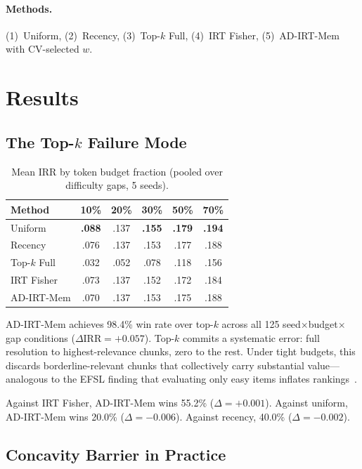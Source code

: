 \documentclass{article}
\begin{document}
\paragraph{Methods.} (1)~Uniform, (2)~Recency, (3)~Top-$k$ Full, (4)~IRT Fisher, (5)~AD-IRT-Mem with CV-selected $w$.

\section{Results}

\subsection{The Top-$k$ Failure Mode}

\begin{table}[ht!]
\centering
\caption{Mean IRR by token budget fraction (pooled over difficulty gaps, 5 seeds).}
\label{tab:main}
\begin{tabular}{lccccc}
\toprule
Method & 10\% & 20\% & 30\% & 50\% & 70\% \\
\midrule
Uniform        & \textbf{.088} & .137 & \textbf{.155} & \textbf{.179} & \textbf{.194} \\
Recency        & .076 & .137 & .153 & .177 & .188 \\
Top-$k$ Full   & .032 & .052 & .078 & .118 & .156 \\
IRT Fisher     & .073 & .137 & .152 & .172 & .184 \\
AD-IRT-Mem     & .070 & .137 & .153 & .175 & .188 \\
\bottomrule
\end{tabular}
\end{table}

AD-IRT-Mem achieves 98.4\% win rate over top-$k$ across all 125 seed$\times$budget$\times$gap conditions ($\Delta\mathrm{IRR} = +0.057$). Top-$k$ commits a systematic error: full resolution to highest-relevance chunks, zero to the rest. Under tight budgets, this discards borderline-relevant chunks that collectively carry substantial value---analogous to the EFSL finding that evaluating only easy items inflates rankings~\citep{kang2026efsl}.

Against IRT Fisher, AD-IRT-Mem wins 55.2\% ($\Delta = +0.001$). Against uniform, AD-IRT-Mem wins 20.0\% ($\Delta = -0.006$). Against recency, 40.0\% ($\Delta = -0.002$).

\subsection{Concavity Barrier in Practice}
\end{document}
